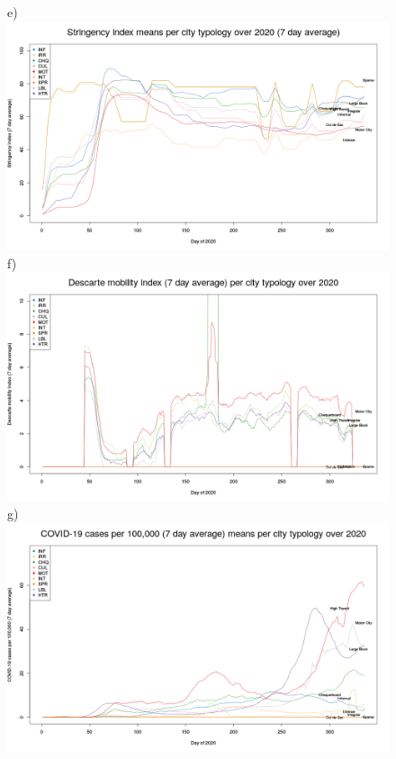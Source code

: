 \documentclass[preprint,12pt]{elsarticle}
\begin{document}
\begin{figure}
{\tiny e)}\includegraphics[trim={0 19 22 43},clip,scale=0.23]{Images/LocalStringencyClusterMean7Ave_2020.png}
{\tiny f)}\includegraphics[trim={0 19 22 43},clip,scale=0.23]{Images/Descarte_mobilityClusterMean7Ave_2020.png}
{\tiny g)}\includegraphics[trim={0 19 22 43},clip,scale=0.23]{Images/CovidCasesClusterMean7Ave_2020.png}


\end{figure}
\end{document}
